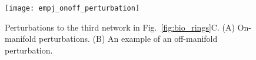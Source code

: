 \documentclass{article} %
\newcounter{ct}
\theoremstyle{definition}
\theoremstyle{remark}
\begin{document}
\begin{figure}[h]
\centering
\texttt{[image: empj\_onoff\_perturbation]}
\caption{Perturbations to the third network in Fig.~\ref{fig:bio_rings}C.
(A) On-manifold perturbations.
(B) An example of an off-manifold perturbation.
}
\label{fig:empj_onoff_perturbation}
\end{figure}















%
%
%
%
\end{document}
